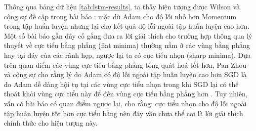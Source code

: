 Thông qua bảng dữ liệu \ref{tab:lstm-results}, ta thấy hiện tượng được Wilson và cộng sự đề cập trong bài báo \cite{wilson2017marginal}: mặc dù Adam cho độ lỗi nhỏ hơn Momentum trong tập huấn luyện nhưng lại cho kết quả độ lỗi ngoài tập huấn luyện cao hơn. Một số bài báo gần đây cố gắng đưa ra lời giải thích cho trường hợp thông qua lý thuyết về cực tiểu bằng phẳng (flat minima) thường nằm ở các vùng bằng phẳng hay tại đáy của các rãnh hẹp, ngược lại ta có cực tiểu nhọn (sharp minima). Dựa trên quan điểm các vùng cực tiểu bằng phẳng tổng quát hoá tốt hơn, Pan Zhou và cộng sự cho rằng lý do Adam có độ lỗi ngoài tập huấn luyện cao hơn SGD là do Adam dễ dàng hội tụ tại các vùng cực tiểu nhọn trong khi SGD lại có thể thoát khỏi vùng cực tiểu này để đến vùng cực tiểu bằng phẳng hơn \cite{zhou2020towards}. Tuy nhiên, vẫn có bài báo có quan điểm ngược lại, cho rằng: cực tiểu nhọn cho độ lỗi ngoài tập huấn luyện tốt hơn cực tiểu bằng \cite{li2018visualizing} nên đây vẫn chưa thể coi là lời giải thích chính thức cho hiện tượng này.